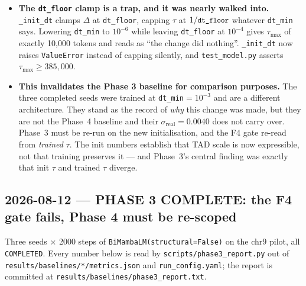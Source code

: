 \documentclass[11pt,a4paper]{article}
\newcommand{\code}[1]{\texttt{\small #1}}
\newcommand{\warn}[1]{\textcolor{warncol}{\textbf{#1}}}
\begin{document}
\begin{itemize}
\item \warn{The \code{dt\_floor} clamp is a trap, and it was nearly walked
into.} \code{\_init\_dt} clamps $\Delta$ at \code{dt\_floor}, capping $\tau$ at
$1/\code{dt\_floor}$ whatever \code{dt\_min} says. Lowering \code{dt\_min} to
$10^{-6}$ while leaving \code{dt\_floor} at $10^{-4}$ gives $\tau_{\max}$ of
exactly 10{,}000 tokens and reads as ``the change did nothing''. \code{\_init\_dt}
now raises \code{ValueError} instead of capping silently, and
\code{test\_model.py} asserts $\tau_{\max} \ge 385{,}000$.
\item \warn{This invalidates the Phase 3 baseline for comparison purposes.} The
three completed seeds were trained at \code{dt\_min}$=10^{-3}$ and are a
different architecture. They stand as the record of \emph{why} this change was
made, but they are not the Phase~4 baseline and their
$\sigma_{\text{real}} = 0.0040$ does not carry over. Phase~3 must be re-run on
the new initialisation, and the F4 gate re-read from \emph{trained} $\tau$. The
init numbers establish that TAD scale is now expressible, not that training
preserves it --- and Phase~3's central finding was exactly that init $\tau$ and
trained $\tau$ diverge.
\end{itemize}

\subsection*{2026-08-12 --- PHASE 3 COMPLETE: the F4 gate fails, Phase 4 must be
re-scoped}

Three seeds $\times$ 2000 steps of \code{BiMambaLM(structural=False)} on the
chr9 pilot, all \code{COMPLETED}. Every number below is read by
\code{scripts/phase3\_report.py} out of
\code{results/baselines/*/metrics.json} and \code{run\_config.yaml}; the report
is committed at \code{results/baselines/phase3\_report.txt}.
\end{document}
